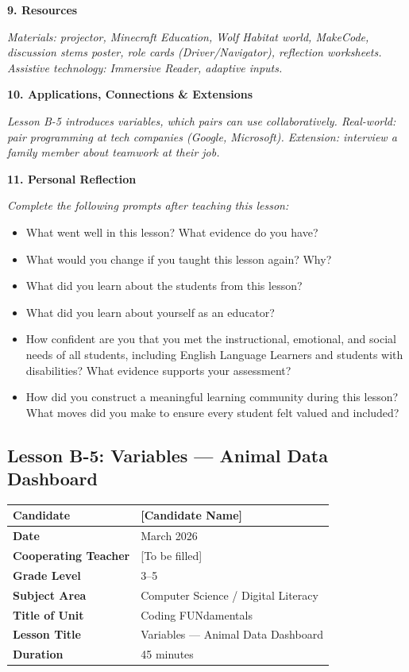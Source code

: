 \documentclass[11pt,letterpaper]{article}
\begin{document}
\textbf{9. Resources}

\textit{Materials: projector, Minecraft Education, Wolf Habitat world, MakeCode, discussion stems poster, role cards (Driver/Navigator), reflection worksheets. Assistive technology: Immersive Reader, adaptive inputs.}

\textbf{10. Applications, Connections \& Extensions}

\textit{Lesson B-5 introduces variables, which pairs can use collaboratively. Real-world: pair programming at tech companies (Google, Microsoft). Extension: interview a family member about teamwork at their job.}

\textbf{11. Personal Reflection}

\textit{Complete the following prompts after teaching this lesson:}

\begin{itemize}
  \item What went well in this lesson? What evidence do you have?

  \item What would you change if you taught this lesson again? Why?

  \item What did you learn about the students from this lesson?

  \item What did you learn about yourself as an educator?

  \item How confident are you that you met the instructional, emotional, and social needs of all students, including English Language Learners and students with disabilities? What evidence supports your assessment?

  \item How did you construct a meaningful learning community during this lesson? What moves did you make to ensure every student felt valued and included?
\end{itemize}

\newpage
\subsection{Lesson B-5: Variables --- Animal Data Dashboard}
\label{sub:LessonB5VariablesAnimalDataDashboard}

\begin{longtable}{|L{0.28\textwidth}|L{0.65\textwidth}|}
\hline
\textbf{Candidate}  & [Candidate Name]  \\
\hline
\textbf{Date}  & March 2026  \\
\hline
\textbf{Cooperating Teacher}  & [To be filled]  \\
\hline
\textbf{Grade Level}  & 3--5  \\
\hline
\textbf{Subject Area}  & Computer Science / Digital Literacy  \\
\hline
\textbf{Title of Unit}  & Coding FUNdamentals  \\
\hline
\textbf{Lesson Title}  & Variables --- Animal Data Dashboard  \\
\hline
\textbf{Duration}  & 45 minutes  \\
\hline
\end{longtable}
\end{document}
